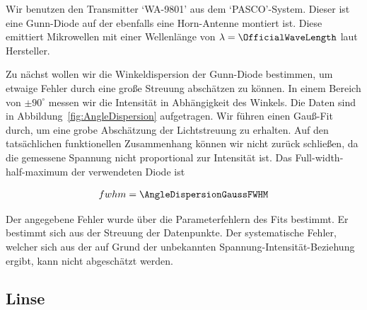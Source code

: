 \documentclass[a4paper,10pt,twocolumn]{article}
\begin{document}

    Wir benutzen den Transmitter `WA-9801' aus dem `PASCO'-System.
    Dieser ist eine Gunn-Diode auf der ebenfalls eine Horn-Antenne montiert ist.
    Diese emittiert Mikrowellen mit einer Wellenlänge von $\lambda = \OfficialWaveLength$ laut Hersteller.
    
    Zu nächst wollen wir die Winkeldispersion der Gunn-Diode bestimmen, um etwaige Fehler durch eine
    große Streuung abschätzen zu können.
    In einem Bereich von $\pm 90 ^{\circ}$ messen wir die Intensität in Abhängigkeit des Winkels.
    Die Daten sind in Abbildung~\ref{fig:AngleDispersion} aufgetragen.
    Wir führen einen Gauß-Fit durch, um eine grobe Abschätzung der Lichtstreuung zu erhalten.
    Auf den tatsächlichen funktionellen Zusammenhang können wir nicht zurück schließen, da die gemessene Spannung
    nicht proportional zur Intensität ist.
    Das Full-width-half-maximum der verwendeten Diode ist
    
    \begin{align*}
        fwhm = \AngleDispersionGaussFWHM
    \end{align*}
    
    Der angegebene Fehler wurde über die Parameterfehlern des Fits bestimmt.
    Er bestimmt sich aus der Streuung der Datenpunkte.
    Der systematische Fehler, welcher sich aus der auf Grund der unbekannten Spannung-Intensität-Beziehung ergibt, kann
    nicht abgeschätzt werden.
    
    \subsection{Linse}

    
\end{document}
